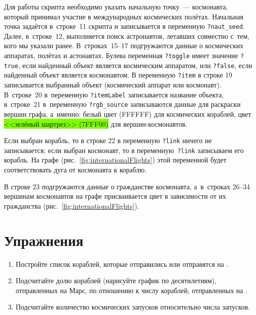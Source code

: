 Для работы скрипта необходимо указать начальную точку~--- космонавта, 
который принимал участие в международных космических полётах. 
Начальная точка задаётся в~строке~11 скрипта и записывается в переменную \lstinline|?naut_seed|. 
Далее, в~строке~12, выполняется поиск астронавтов, 
летавших совместно с~тем, кого мы указали ранее. 
В~строках~15--17 подгружаются данные о космических аппаратах, полётах и астонавтах. 
Булева переменная \lstinline|?toggle| имеет значение \lstinline|?true|, 
если найденный объект является космическим аппаратом, 
или \lstinline|?false|, 
если найденный объект является космонавтом. 
В переменную \lstinline|?item| в строке 19 записывается выбранный объект (космический аппарат или космонавт). 
В~строке~20 в~переменную \lstinline|?itemLabel| записывается название объекта, 
в~строке~21 в~переменную \lstinline|?rgb_source| записываются 
данные для раскраски вершин графа, а~именно: 
белый цвет (FFFFFF) для космических кораблей, 
цвет \colorbox{chartreuse}{<<зелёный шартрез>> (7FFF00)} для вершин-космонавтов. 


Если выбран корабль, то в строке 22 в переменную \lstinline|?link| ничего не записывается; 
если выбран космонавт, то в переменную~\lstinline|?link| записываем его корабль. 
На графе (рис.~\ref{fig:internationalFlights}) этой переменной будет соответствовать дуга от космонавта к кораблю. 

В строке 23 подгружаются данные о гражданстве космонавта, 
а~в~строках 26--34 вершинам космонавтов на графе присваивается цвет в зависимости от их гражданства (рис.~\ref{fig:internationalFlights}). 





\section{Упражнения}
\begin{enumerate}
  \item Постройте список кораблей, которые отправились или отправятся на .
  \item Подсчитайте долю кораблей (нарисуйте график по десятилетиям), 
      отправленных на Марс, 
      по отношению к числу кораблей, отправленных на .
  \item Подсчитайте количество  космических запусков 
      относительно числа
       запусков.%
\end{enumerate}




